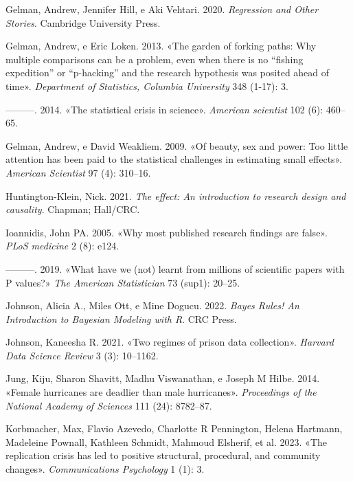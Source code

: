 \documentclass[
  letterpaper,
  krantz2]{{[}./krantz{]}}
\newlength{\cslhangindent}
\newenvironment{CSLReferences}[2] %
 {\begin{list}{}{%
  \setlength{\itemindent}{0pt}
  \setlength{\leftmargin}{0pt}
  \setlength{\parsep}{0pt}
  \ifodd #1
   \setlength{\leftmargin}{\cslhangindent}
   \setlength{\itemindent}{-1\cslhangindent}
  \fi
  \setlength{\itemsep}{#2\baselineskip}}}
 {\end{list}}
\begin{document}
\begin{CSLReferences}{1}{0}
Gelman, Andrew, Jennifer Hill, e Aki Vehtari. 2020. \emph{Regression and
Other Stories}. Cambridge University Press.

Gelman, Andrew, e Eric Loken. 2013. {«The garden of forking paths: Why
multiple comparisons can be a problem, even when there is no {``fishing
expedition''} or {``p-hacking''} and the research hypothesis was posited
ahead of time»}. \emph{Department of Statistics, Columbia University}
348 (1-17): 3.

---------. 2014. {«The statistical crisis in science»}. \emph{American
scientist} 102 (6): 460--65.

Gelman, Andrew, e David Weakliem. 2009. {«Of beauty, sex and power: Too
little attention has been paid to the statistical challenges in
estimating small effects»}. \emph{American Scientist} 97 (4): 310--16.

Huntington-Klein, Nick. 2021. \emph{The effect: An introduction to
research design and causality}. Chapman; Hall/CRC.

Ioannidis, John PA. 2005. {«Why most published research findings are
false»}. \emph{PLoS medicine} 2 (8): e124.

---------. 2019. {«What have we (not) learnt from millions of scientific
papers with P values?»} \emph{The American Statistician} 73 (sup1):
20--25.

Johnson, Alicia A., Miles Ott, e Mine Dogucu. 2022. \emph{{Bayes Rules!
An Introduction to Bayesian Modeling with R}}. CRC Press.

Johnson, Kaneesha R. 2021. {«Two regimes of prison data collection»}.
\emph{Harvard Data Science Review} 3 (3): 10--1162.

Jung, Kiju, Sharon Shavitt, Madhu Viswanathan, e Joseph M Hilbe. 2014.
{«Female hurricanes are deadlier than male hurricanes»}.
\emph{Proceedings of the National Academy of Sciences} 111 (24):
8782--87.

Korbmacher, Max, Flavio Azevedo, Charlotte R Pennington, Helena
Hartmann, Madeleine Pownall, Kathleen Schmidt, Mahmoud Elsherif, et al.
2023. {«The replication crisis has led to positive structural,
procedural, and community changes»}. \emph{Communications Psychology} 1
(1): 3.


\end{CSLReferences}
\end{document}
